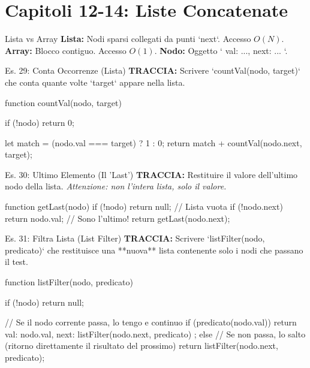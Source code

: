 \section{Capitoli 12-14: Liste Concatenate}

\begin{dizionario}{Lista vs Array}
\textbf{Lista:} Nodi sparsi collegati da punti `next`. Accesso $O(N)$.
\textbf{Array:} Blocco contiguo. Accesso $O(1)$.
\textbf{Nodo:} Oggetto `{ val: ..., next: ... }`.
\end{dizionario}

\begin{esercizio}{Es. 29: Conta Occorrenze (Lista)}
\textbf{TRACCIA:} Scrivere `countVal(nodo, target)` che conta quante volte `target` appare nella lista.
\end{esercizio}

\begin{jsbox}
function countVal(nodo, target) {
    if (!nodo) return 0;
    
    let match = (nodo.val === target) ? 1 : 0;
    return match + countVal(nodo.next, target);
}
\end{jsbox}

\begin{esercizio}{Es. 30: Ultimo Elemento (Il 'Last')}
\textbf{TRACCIA:} Restituire il valore dell'ultimo nodo della lista.
\textit{Attenzione: non l'intera lista, solo il valore.}
\end{esercizio}

\begin{jsbox}
function getLast(nodo) {
    if (!nodo) return null; // Lista vuota
    if (!nodo.next) return nodo.val; // Sono l'ultimo!
    return getLast(nodo.next);
}
\end{jsbox}

\begin{esercizio}{Es. 31: Filtra Lista (List Filter)}
\textbf{TRACCIA:} Scrivere `listFilter(nodo, predicato)` che restituisce una **nuova** lista contenente solo i nodi che passano il test.
\end{esercizio}

\begin{jsbox}
function listFilter(nodo, predicato) {
    if (!nodo) return null;
    
    // Se il nodo corrente passa, lo tengo e continuo
    if (predicato(nodo.val)) {
        return {
            val: nodo.val,
            next: listFilter(nodo.next, predicato)
        };
    } else {
        // Se non passa, lo salto (ritorno direttamente il risultato del prossimo)
        return listFilter(nodo.next, predicato);
    }
}
\end{jsbox}

